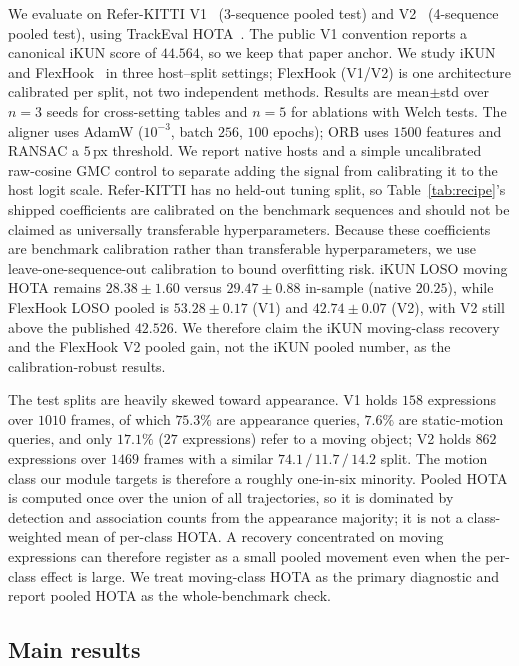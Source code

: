 \documentclass[sigconf,review,anonymous]{acmart}
\begin{document}
We evaluate on Refer-KITTI V1~\cite{transrmot} (3-sequence pooled test) and V2~\cite{temprmot} (4-sequence pooled test), using TrackEval HOTA~\cite{hota}. The public V1 convention reports a canonical iKUN score of $44.564$, so we keep that paper anchor. We study iKUN~\cite{ikun} and FlexHook~\cite{flexhook} in three host--split settings; FlexHook (V1/V2) is one architecture calibrated per split, not two independent methods. Results are mean$\pm$std over $n{=}3$ seeds for cross-setting tables and $n{=}5$ for ablations with Welch tests. The aligner uses AdamW ($10^{-3}$, batch $256$, $100$ epochs); ORB uses $1500$ features and RANSAC a $5$\,px threshold. We report native hosts and a simple uncalibrated raw-cosine GMC control to separate adding the signal from calibrating it to the host logit scale. Refer-KITTI has no held-out tuning split, so Table~\ref{tab:recipe}'s shipped coefficients are calibrated on the benchmark sequences and should not be claimed as universally transferable hyperparameters. Because these coefficients are benchmark calibration rather than transferable hyperparameters, we use leave-one-sequence-out calibration to bound overfitting risk. iKUN LOSO moving HOTA remains $28.38 \pm 1.60$ versus $29.47 \pm 0.88$ in-sample (native $20.25$), while FlexHook LOSO pooled is $53.28 \pm 0.17$ (V1) and $42.74 \pm 0.07$ (V2), with V2 still above the published $42.526$. We therefore claim the iKUN moving-class recovery and the FlexHook V2 pooled gain, not the iKUN pooled number, as the calibration-robust results.

The test splits are heavily skewed toward appearance. V1 holds $158$ expressions over $1010$ frames, of which $75.3\%$ are appearance queries, $7.6\%$ are static-motion queries, and only $17.1\%$ ($27$ expressions) refer to a moving object; V2 holds $862$ expressions over $1469$ frames with a similar $74.1\,/\,11.7\,/\,14.2$ split. The motion class our module targets is therefore a roughly one-in-six minority. Pooled HOTA is computed once over the union of all trajectories, so it is dominated by detection and association counts from the appearance majority; it is not a class-weighted mean of per-class HOTA. A recovery concentrated on moving expressions can therefore register as a small pooled movement even when the per-class effect is large. We treat moving-class HOTA as the primary diagnostic and report pooled HOTA as the whole-benchmark check.

\subsection{Main results}
\label{sec:main}
\end{document}

